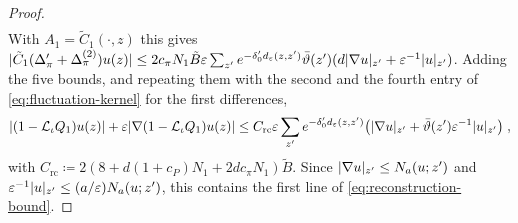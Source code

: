 \documentclass[11pt]{preprint}
\DeclarePairedDelimiter{\abs}{\lvert}{\rvert}
\numberwithin{equation}{section}
\theoremstyle{definition}
\theoremstyle{remark}
\theoremstyle{plain}
\begin{document}
\begin{proof}
\begin{multline*}
\end{multline*}
With $A_1 = \tilde C_1(\cdot, z)$ this gives $\abs{\tilde C_1(\Delta'_\pi + \Delta^{(2)}_\pi)u(z)} \leq 2c_\pi N_1\tilde B\varepsilon\sum_{z'}e^{-\delta'_0d_\varepsilon(z,z')}\bar\vartheta(z')(d\abs{\nabla u}_{z'} + \varepsilon^{-1}\abs u_{z'})$. Adding the five bounds, and repeating them with the second and the fourth entry of \eqref{eq:fluctuation-kernel} for the first differences,
\begin{equation}\label{eq:reconstruction-crude}
    \abs{(1 - \mathcal L_\iota Q_1)u(z)} + \varepsilon\abs{\nabla(1 - \mathcal L_\iota Q_1)u(z)} \leq C_{\mathrm{rc}}\varepsilon\sum_{z'}e^{-\delta'_0d_\varepsilon(z,z')}\bigl(\abs{\nabla u}_{z'} + \bar\vartheta(z')\varepsilon^{-1}\abs u_{z'}\bigr)\;,
\end{equation}
with $C_{\mathrm{rc}} \coloneqq 2(8 + d(1 + c_P)N_1 + 2dc_\pi N_1)\tilde B$. Since $\abs{\nabla u}_{z'} \leq N_a(u; z')$ and $\varepsilon^{-1}\abs u_{z'} \leq (a/\varepsilon)N_a(u; z')$, this contains the first line of \eqref{eq:reconstruction-bound}.


\end{proof}
\end{document}
